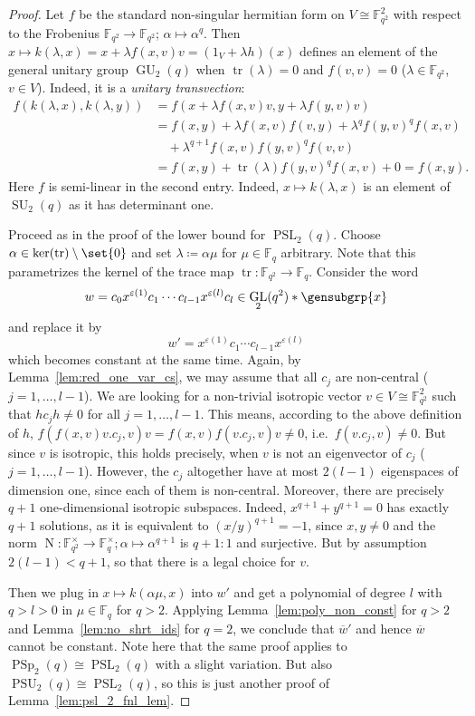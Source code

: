 \documentclass[a4paper,11pt]{amsproc}
\newcommand{\finfield}{\mathbb{F}}%
\DeclareMathOperator{\PSp}{PSp}%
\DeclareMathOperator{\GU}{GU}%
\DeclareMathOperator{\PSU}{PSU}%
\DeclareMathOperator{\GL}{GL}%
\DeclareMathOperator{\PSL}{PSL}%
\DeclareMathOperator{\tr}{tr}%
\DeclareMathOperator{\SU}{SU}%
\DeclareMathOperator{\N}{N}%
\theoremstyle{plain}
\theoremstyle{definition}
\begin{document}
	\begin{proof}
		Let $f$ be the standard non-singular hermitian form on $V\cong\finfield_{q^2}^2$ with respect to the Frobenius $\finfield_{q^2}\to\finfield_{q^2}$; $\alpha\mapsto\alpha^q$. Then $x\mapsto k(\lambda,x)=x+\lambda f(x,v)v=(1_V+\lambda h)(x)$ defines an element of the general unitary group $\GU_2(q)$ when $\tr(\lambda)=0$ and $f(v,v)=0$ ($\lambda\in\finfield_{q^2}$, $v\in V$). Indeed, it is a \emph{unitary transvection}:
		\begin{align*}
			f(k(\lambda,x),k(\lambda,y))
			&=f(x+\lambda f(x,v)v,y+\lambda f(y,v)v)\\
			&=f(x,y)+\lambda f(x,v)f(v,y)+\lambda^q f(y,v)^q f(x,v)\\
			&\quad+\lambda^{q+1}f(x,v)f(y,v)^q f(v,v)\\
			&=f(x,y)+\tr(\lambda)f(y,v)^q f(x,v)+0=f(x,y).
		\end{align*}
		Here $f$ is semi-linear in the second entry. Indeed, $x\mapsto k(\lambda,x)$ is an element of $\SU_2(q)$ as it has determinant one.
		
		Proceed as in the proof of the lower bound for $\PSL_2(q)$. Choose $\alpha\in\ker(\tr)\setminus\set{0}$ and set $\lambda\coloneqq\alpha\mu$ for $\mu\in\finfield_q$ arbitrary. Note that this parametrizes the kernel of the trace map $\tr\colon\finfield_{q^2}\to\finfield_q$. Consider the word 
		$$
		w=c_0 x^{\varepsilon(1)}c_1\cdots c_{l-1} x^{\varepsilon(l)} c_l\in\GL_2(q^2)\ast\gensubgrp{x}
		$$ 
		and replace it by 
		$$w'=x^{\varepsilon(1)}c_1\cdots c_{l-1} x^{\varepsilon(l)}
		$$ 
		which becomes constant at the same time. Again, by Lemma~\ref{lem:red_one_var_cs}, we may assume that all $c_j$ are non-central ($j=1,\ldots,l-1$). We are looking for a non-trivial isotropic vector $v\in V\cong\finfield_{q^2}^2$ such that $hc_j h\neq0$ for all $j=1,\ldots,l-1$. This means, according to the above definition of $h$, $f(f(x,v)v.c_j,v)v=f(x,v)f(v.c_j,v)v\neq 0$, i.e.\ $f(v.c_j,v)\neq 0$. But since $v$ is isotropic, this holds precisely, when $v$ is not an eigenvector of $c_j$ ($j=1,\ldots,l-1$). However, the $c_j$ altogether have at most $2(l-1)$ eigenspaces of dimension one, since each of them is non-central. Moreover, there are precisely $q+1$ one-dimensional isotropic subspaces. Indeed, $x^{q+1}+y^{q+1}=0$ has exactly $q+1$ solutions, as it is equivalent to $(x/y)^{q+1}=-1$, since $x,y\neq 0$ and the norm $\N\colon\finfield_{q^2}^\times\to\finfield_q^\times; \alpha\mapsto\alpha^{q+1}$ is $q+1:1$ and surjective. But by assumption $2(l-1)<q+1$, so that there is a legal choice for $v$.
		
		Then we plug in $x\mapsto k(\alpha\mu,x)$ into $w'$ and get a polynomial of degree $l$ with $q>l>0$ in $\mu\in\finfield_q$ for $q>2$. Applying Lemma~\ref{lem:poly_non_const} for $q>2$ and Lemma~\ref{lem:no_shrt_ids} for $q=2$, we conclude that $\overline{w}'$ and hence $\overline{w}$ cannot be constant. Note here that the same proof applies to $\PSp_2(q)\cong\PSL_2(q)$ with a slight variation. But also $\PSU_2(q)\cong\PSL_2(q)$, so this is just another proof of Lemma~\ref{lem:psl_2_fnl_lem}.
	\end{proof}
	
\end{document}
